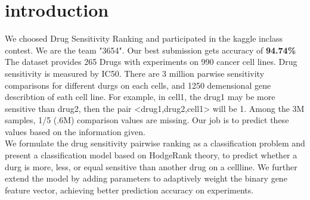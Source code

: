 \section{introduction}
We choosed Drug Sensitivity Ranking and participated in the kaggle inclass contest.  We are the team "3654". Our best submission gets accuracy of \textbf{94.74\%}
The dataset provides 265 Drugs with experiments on 990 cancer cell lines. Drug sensitivity is measured by IC50. There are 3 million parwise sensitivity comparisons for different durgs on each cells, and 1250 demensional gene describtion of eath cell line. For example, in cell1, the drug1 may be more sensitive than drug2, then the pair <drug1,drug2,cell1> will be 1. Among the 3M samples, 1/5 (.6M) comparison values are missing. Our job is to predict these values based on the information given. \\
We formulate the drug sensitivity pairwise ranking as a classification problem and present a classification model based on HodgeRank theory, to predict whether a durg is more, less, or equal sensitive than another drug on a cellline. We further extend the model by adding parameters to adaptively weight the binary gene feature vector, achieving better prediction accuracy on experiments.
